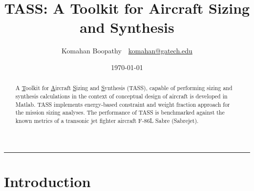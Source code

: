 \documentclass[pdftex,12pt,letter]{article}
\title{\textbf{\textsc{TASS}: A Toolkit for Aircraft Sizing and Synthesis}}
\author{Komahan Boopathy~~\url{komahan@gatech.edu}} \date{\today}
\begin{document}
\maketitle
\vspace{-0.25in}
\rule{\linewidth}{2pt}

\begin{abstract}
A  \ul{T}oolkit for \ul{A}ircraft \ul{S}izing and \ul{S}ynthesis (TASS), capable of performing sizing and synthesis calculations  in the context of conceptual design of aircraft is developed in Matlab\cite{MATLAB}. TASS implements energy-based constraint and weight fraction approach for the mission sizing analyses.  The performance of TASS is benchmarked against the known metrics of a transonic jet fighter aircraft F-86L Sabre (Sabrejet).
\end{abstract}

\section{Introduction}
\end{document}
